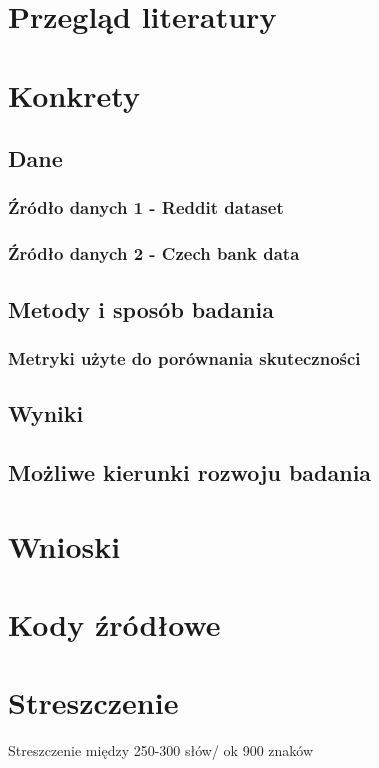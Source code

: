 \documentclass[12pt,a4paper,twoside,openany]{book}
\begin{document}
\chapter{Przegląd literatury}

\chapter{Konkrety}
\section{Dane}
\subsection{Źródło danych 1 - Reddit dataset}
\subsection{Źródło danych 2 - Czech bank data}

\section{Metody i sposób badania}
\subsection{Metryki użyte do porównania skuteczności}
\section{Wyniki}
\section{Możliwe kierunki rozwoju badania}



\chapter{Wnioski}



\clearpage
{}



\clearpage
{}
\listoffigures

\clearpage
\listoftables
{}

\appendix
\chapter*{Kody źródłowe}

\chapter*{Streszczenie}
Streszczenie między 250-300 słów/ ok 900 znaków

\clearpage
\end{document}
